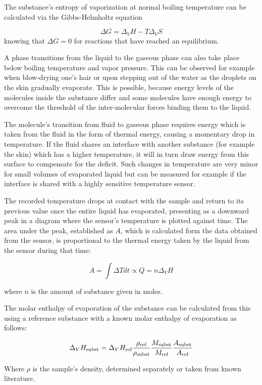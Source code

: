 {The substance’s entropy of vaporization at normal boiling temperature can be calculated via the Gibbs-Helmholtz equation 

\begin{equation}\label{eq:gibbs} %
    \Delta G = \Delta_VH - T \Delta_VS
\end{equation}
knowing that $\Delta G = 0$ for reactions that have reached an equilibrium.

A phase transitions from the liquid to the gaseous phase can also take place below boiling temperature and vapor pressure. This can be observed for example when blow-drying one’s hair or upon stepping out of the water as the droplets on the skin gradually evaporate. This is possible, because energy levels of the molecules inside the substance differ and some molecules have enough energy to overcome the threshold of the inter-molecular forces binding them to the liquid.

The molecule’s transition from fluid to gaseous phase requires energy which is taken from the fluid in the form of thermal energy, causing a momentary drop in temperature. If the fluid shares an interface with another substance (for example the skin) which has a higher temperature, it will in turn draw energy from this surface to compensate for the deficit.
Such changes in temperature are very minor for small volumes of evaporated liquid but can be measured for example if the interface is shared with a highly sensitive temperature sensor. 

The recorded temperature drops at contact with the sample and return to its previous value once the entire liquid has evaporated, presenting as a downward peak in a diagram where the sensor’s temperature is plotted against time. The area under the peak, established as $A$, which is calculated form the data obtained from the sensor, is proportional to the thermal energy taken by the liquid from the sensor during that time:

\begin{equation} \label{eq:6.15} %
    A = \int \Delta T dt \propto Q = n \Delta_VH
\end{equation}

where $n$ is the amount of substance given in moles.

The molar enthalpy of evaporation of the substance can be calculated from this using a reference substance with a known molar enthalpy of evaporation as follows:

\begin{equation} \label{eq:6.18} %
    \Delta_VH_{\text{subst}} = \Delta_VH_{\text{ref}} {\rho_{\text{ref}} \over \rho_{\text{subst}}} {M_{\text{subst}} \over M_{\text{ref}}} {A_{\text{subst}} \over A_{\text{ref}}}
\end{equation}

Where $\rho$ is the sample’s density, determined separately or taken from known literature.


}